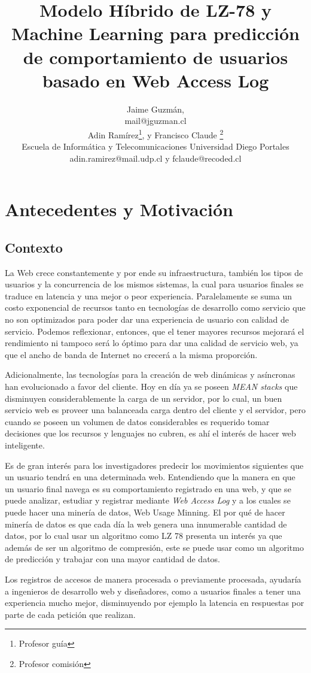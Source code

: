 \documentclass{udparticle}
\title{ Modelo Híbrido de LZ-78 y Machine Learning para predicción de comportamiento de usuarios basado en Web Access Log }
\author{ Jaime Guzmán, \\ {\small mail@jguzman.cl}\protect\\[5pt]%
  {\small Adin Ramírez\thanks{Profesor guía}, y Francisco Claude \thanks{Profesor comisión}} \\
  {\small Escuela de Informática y Telecomunicaciones Universidad Diego Portales} \\
  {\small adin.ramirez@mail.udp.cl y fclaude@recoded.cl }\protect\\[5pt]%
}
\begin{document}
\maketitle
\section{Antecedentes y Motivación}

\subsection{Contexto}

  La Web crece constantemente y por ende su infraestructura, también los tipos de usuarios y la concurrencia de los mismos sistemas, la cual para usuarios finales se traduce en latencia y una mejor o peor experiencia. 
  Paralelamente se suma un costo exponencial de recursos tanto en tecnologías de desarrollo como servicio que no son optimizados para poder dar una experiencia de usuario con calidad de servicio. Podemos reflexionar, entonces, que el  tener mayores recursos mejorará el rendimiento ni tampoco será lo óptimo para dar una calidad de servicio web, ya que el ancho de banda de Internet no crecerá a la misma proporción.
   
  Adicionalmente, las tecnologías para la creación de web dinámicas y asíncronas han evolucionado a favor del cliente.
  Hoy en día ya se poseen \emph{MEAN stacks} que disminuyen considerablemente la carga de un servidor, por lo cual, un buen servicio web es proveer una balanceada carga dentro del cliente y el servidor, pero cuando se poseen un volumen de datos considerables es requerido tomar decisiones que los recursos y lenguajes no cubren, es ahí el interés de hacer  web inteligente.

  Es de gran interés para los investigadores predecir los movimientos siguientes que un usuario tendrá en una determinada web.
  Entendiendo que la manera en que un usuario final navega es su comportamiento registrado en una web, y que se puede analizar, estudiar y registrar mediante \emph{Web Access Log} y a los cuales se puede hacer una minería de datos, Web Usage Minning. El por qué de hacer minería de datos es que cada día la web genera una innumerable cantidad de datos, por lo cual usar un algoritmo como LZ 78 presenta un interés ya que además de ser un algoritmo de compresión, este se puede usar como un algoritmo de predicción y trabajar con una mayor cantidad de datos.
  
  Los registros de accesos de manera procesada o previamente procesada, ayudaría a ingenieros de desarrollo web y diseñadores, como a  usuarios finales a tener una experiencia mucho mejor, disminuyendo por ejemplo la latencia en respuestas por parte de cada petición que realizan.
  
\end{document}
